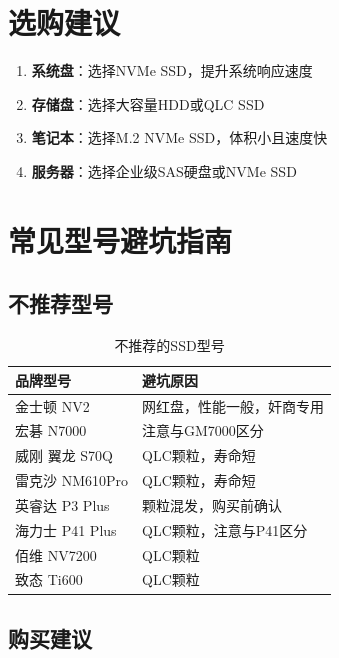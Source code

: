 \documentclass[12pt,UTF8]{ctexbook}
\begin{document}
\section{选购建议}

\begin{enumerate}
    \item \textbf{系统盘}：选择NVMe SSD，提升系统响应速度
    \item \textbf{存储盘}：选择大容量HDD或QLC SSD
    \item \textbf{笔记本}：选择M.2 NVMe SSD，体积小且速度快
    \item \textbf{服务器}：选择企业级SAS硬盘或NVMe SSD
\end{enumerate}

\section{常见型号避坑指南}

\subsection{不推荐型号}

\begin{table}[H]
    \centering
    \begin{tabular}{|p{3cm}|p{9cm}|}
        \hline
        \textbf{品牌型号} & \textbf{避坑原因} \\
        \hline
        金士顿 NV2 & 网红盘，性能一般，奸商专用 \\
        \hline
        宏碁 N7000 & 注意与GM7000区分 \\
        \hline
        威刚 翼龙 S70Q & QLC颗粒，寿命短 \\
        \hline
        雷克沙 NM610Pro & QLC颗粒，寿命短 \\
        \hline
        英睿达 P3 Plus & 颗粒混发，购买前确认 \\
        \hline
        海力士 P41 Plus & QLC颗粒，注意与P41区分 \\
        \hline
        佰维 NV7200 & QLC颗粒 \\
        \hline
        致态 Ti600 & QLC颗粒 \\
        \hline
    \end{tabular}
    \caption{不推荐的SSD型号}
    \label{tab:ssd_avoid}
\end{table}

\subsection{购买建议}
\end{document}
